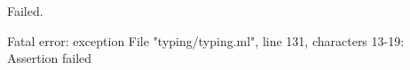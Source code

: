 \chklistingfalse
{}
\begin{ChkListingMsg}
Failed.
\end{ChkListingMsg}
\begin{ChkListingErr}
Fatal error: exception File "typing/typing.ml", line 131, characters 13-19: Assertion failed
\end{ChkListingErr}
